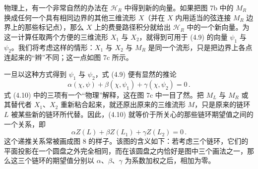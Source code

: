 \documentclass[11pt,a4paper]{article}
\begin{document}

物理上，有一个非常自然的办法在 $\mathcal{H}_R$ 中得到新的向量。如果把图 7b 中的 $M_R$ 换成任何一个具有相同边界的其他三维流形 $X$（并在 $X$ 内用适当的弦连接 $M_R$ 边界上的那些标记点），那么 $X$ 上的费曼路径积分就给出 $\mathcal{H}_R$ 中的一个新向量。为这一计算任取两个方便的三维流形 $X_1$ 与 $X_2$，就得到可用于 (4.9) 的向量 $\psi_1$ 与 $\psi_2$。我们将考虑这样的情形：$X_1$ 与 $X_2$ 与 $M_R$ 是同一个流形，只是把边界上各点连起来的“辫”不同；这一点如图 7c 所示。

一旦以这种方式得到 $\psi_1$ 与 $\psi_2$，式 (4.9) 便有显然的推论
\begin{equation}
    \alpha(\chi,\psi) + \beta(\chi,\psi_1) + \gamma(\chi,\psi_2) = 0\,.
    \tag{4.10}
\end{equation}
式 (4.10) 中的三项有一个“物理”解释，这在图 7c 中一目了然。把 $M_L$ 与 $M_R$ 或其替代者 $X_1$、$X_2$ 重新粘合起来，就还原出原来的三维流形 $M$，只是原来的链环 $L$ 被某些新的链环所代替。因此，(4.10) 就等价于所关心的那些链环期望值之间的一个关系，即
\begin{equation}
    \alpha Z(L) + \beta Z(L_1) + \gamma Z(L_2) = 0\,.
    \tag{4.11}
\end{equation}
这个递推关系常被画成图 8 的样子。该图的含义如下：若考虑三个链环，它们的平面投影在一个圆盘之外完全相同，而在该圆盘之内恰好是图中三个画法之一，那么这三个链环的期望值分别以 $\alpha$、$\beta$、$\gamma$ 为系数加权之后，相加为零。

\end{document}
